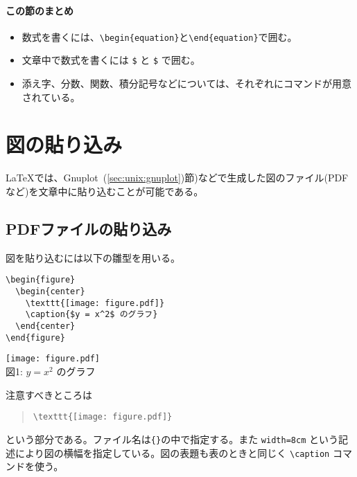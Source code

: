 \paragraph{この節のまとめ}

\begin{itemize}
\item 数式を書くには、\verb|\begin{equation}|と\verb|\end{equation}|で囲む。
\item 文章中で数式を書くには \texttt{\$} と \texttt{\$} で囲む。
\item 添え字、分数、関数、積分記号などについては、それぞれにコマンドが用意されている。
\end{itemize}

\section{図の貼り込み}
\label{sec:latex:picture}

\LaTeX では、Gnuplot~(\ref{sec:unix:gnuplot})節)などで生成した図のファイル(PDFなど)を文章中に貼り込むことが可能である。

\subsection{PDFファイルの貼り込み}
\label{sec:latex:include_pdf}

図を貼り込むには以下の雛型を用いる。
\begin{reidai}
\begin{verbatim}
\begin{figure}
  \begin{center}
    \texttt{[image: figure.pdf]}
    \caption{$y = x^2$ のグラフ}
  \end{center}
\end{figure}
\end{verbatim}
\end{reidai}
\vspace*{-1.5em}
\begin{kekka}
  \begin{center}
    \texttt{[image: figure.pdf]} \\
    図1: $y = x^2$ のグラフ
  \end{center}
\end{kekka} \noindent
注意すべきところは
\begin{quotation}
  \verb|\texttt{[image: figure.pdf]}|
\end{quotation}
という部分である。ファイル名は{\tt \{\}}の中で指定する。また \texttt{width=8cm} という記述により図の横幅を指定している。図の表題も表のときと同じく \verb|\caption| コマンドを使う。

